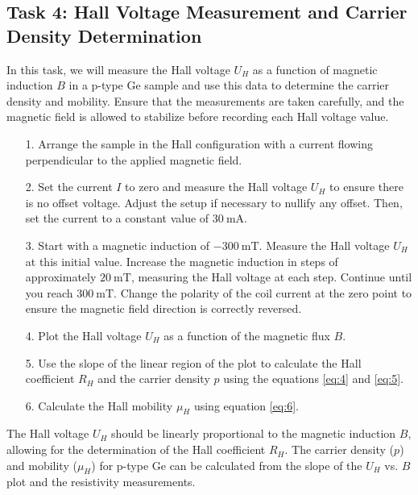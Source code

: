 \documentclass[11pt]{article}
\begin{document}
\clearpage
	
	\subsection{Task 4: Hall Voltage Measurement and Carrier Density Determination}
	
	In this task, we will measure the Hall voltage \(U_H\) as a function of magnetic induction \(B\) in a p-type Ge sample and use this data to determine the carrier density and mobility. Ensure that the measurements are taken carefully, and the magnetic field is allowed to stabilize before recording each Hall voltage value.
	
	\begin{enumerate}
		\item[1.] Arrange the sample in the Hall configuration with a current flowing perpendicular to the applied magnetic field.
		\item[2.] Set the current \(I\) to zero and measure the Hall voltage \(U_H\) to ensure there is no offset voltage. Adjust the setup if necessary to nullify any offset. Then, set the current to a constant value of $\qty{30}{\milli\ampere}$.
		\item[3.] Start with a magnetic induction of $\qty{-300}{\milli\tesla}$. Measure the Hall voltage \(U_H\) at this initial value. Increase the magnetic induction in steps of approximately $\qty{20}{\milli\tesla}$, measuring the Hall voltage at each step. Continue until you reach $\qty{+300}{\milli\tesla}$. Change the polarity of the coil current at the zero point to ensure the magnetic field direction is correctly reversed.
		\item[4.] Plot the Hall voltage \(U_H\) as a function of the magnetic flux \(B\).
		\item[5.] Use the slope of the linear region of the plot to calculate the Hall coefficient \(R_H\) and the carrier density \(p\) using the equations \ref{eq:4} and \ref{eq:5}.
		\item[6.] Calculate the Hall mobility \(\mu_H\) using equation \ref{eq:6}.
	\end{enumerate}
	
	The Hall voltage \(U_H\) should be linearly proportional to the magnetic induction \(B\), allowing for the determination of the Hall coefficient \(R_H\). The carrier density (\(p\)) and mobility (\(\mu_H\)) for p-type Ge can be calculated from the slope of the \(U_H\) vs. \(B\) plot and the resistivity measurements.
	
\clearpage
\end{document}
